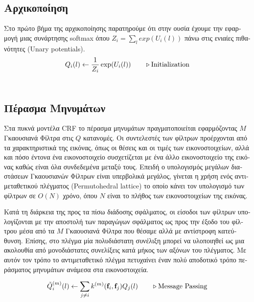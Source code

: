 \subsection{\textgreek{Αρχικοποίηση}}
\textgreek{Στο πρώτο βήμα της αρχικοποίησης παρατηρούμε ότι στην ουσία έχουμε την εφαρμογή μιας συνάρτησης} softmax \textgreek{όπου } $Z_{i} = \sum_{l} exp(U_{i}(l))$ \textgreek{πάνω στις ενιαίες πιθανότητες} (Unary potentials). 
\\
\begin{equation}
    \label{init}
    \centering
    Q_{i}(l) \gets \frac{1}{Z_{i}} \exp(U_{i}(l))  \qquad \triangleright \text{Initialization} 
\end{equation}\\[1cm]

\subsection{\textgreek{Πέρασμα Μηνυμάτων}}
\textgreek{Στα πυκνά μοντέλα }CRF \textgreek{το πέρασμα μηνυμάτων πραγματοποιείται εφαρμόζοντας $M$ Γκαουσιανά Φίλτρα στις $Q$ κατανομές. Οι συντελεστές των φίλτρων προέρχονται από τα χαρακτηριστικά της εικόνας, όπως οι θέσεις και οι τιμές των εικονοστοιχείων, αλλά και πόσο έντονα ένα εικονοστοιχείο συσχετίζεται με ένα άλλο εικονοστοιχείο της εικόνας καθώς είναι όλα συνδεδεμένα μεταξύ τους. Επειδή ο υπολογισμός μεγάλων διαστάσεων Γκαουσιανών Φίλτρων είναι υπερβολικά μεγάλος, γίνεται η χρήση ενός αντιμεταθετικού πλέγματος} (Permutohedral lattice) \cite{lattice} \textgreek{το οποίο κάνει τον υπολογισμό των φίλτρων σε $O(N)$ χρόνο, όπου $N$ είναι το πλήθος των εικονοστοιχείων της εικόνας.} 
\par
\textgreek{Κατά τη διάρκεια της προς τα πίσω διάδοσης σφάλματος, οι είσοδοι των φίλτρων υπολογίζονται με την αποστολή των παραγώγων σφάλματος ως προς την έξοδο του φίλτρου μέσα από τα $M$ Γκαουσιανά Φίλτρα που θέσαμε αλλά με αντίστροφη κατεύθυνση. 
Επίσης, στο πλέγμα μία πολυδιάστατη συνέλιξη μπορεί να υλοποιηθεί ως μια ακολουθία από μονοδιάστατες συνελίξεις κατά μήκος των αξόνων του πλέγματος. Με αυτόν τον τρόπο το αντιμεταθετικό πλέγμα πετυχαίνει έναν πολύ αποδοτικό τρόπο περάσματος μηνυμάτων ανάμεσα στα εικονοστοιχεία.}

\begin{equation}
    \label{message}
    \centering
    \tilde{Q}_{i}^{(m)}(l) \gets \sum_{j\neq i} k^{(m)}(\mathbf{f}_{i},\mathbf{f}_{j})Q_{j}(l)  \qquad \triangleright \text{Message Passing} 
\end{equation}
\\[1cm]



